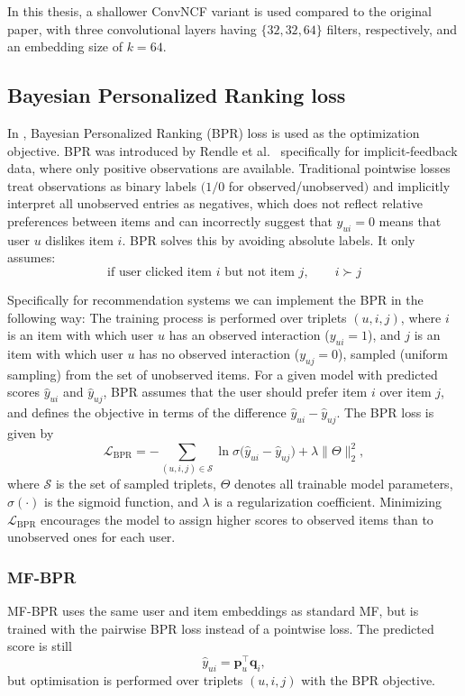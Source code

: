 \documentclass[11pt]{article}
\begin{document}
In this thesis, a shallower ConvNCF variant is used compared to the original paper, with three convolutional layers having $\{32, 32, 64\}$ filters, respectively, and an embedding size of $k=64$.
    
\subsection{Bayesian Personalized Ranking loss}
In \cite{he2018convncf}, Bayesian Personalized Ranking (BPR) loss is used as the optimization objective. 
BPR was introduced by Rendle et al.~\cite{rendle2012bpr} specifically for implicit-feedback data, where 
only positive observations are available. Traditional pointwise losses treat observations as binary labels 
$(1/0$ for observed/unobserved$)$ and implicitly interpret all unobserved entries as negatives, which does 
not reflect relative preferences between items and can incorrectly suggest that $y_{ui} = 0$ means that 
user $u$ dislikes item $i$. BPR solves this by avoiding absolute labels. It only assumes:
\[
\text{if user clicked item } i \text{ but not item } j,\qquad i \succ j
\]

Specifically for recommendation systems we can implement the BPR in the following way:
The training process is performed over triplets $(u,i,j)$, where $i$ is an item with which user $u$ has an observed interaction ($y_{ui} = 1$), and $j$ is an item with which user $u$ has no observed interaction ($y_{uj} = 0$), sampled (uniform sampling) from the set of unobserved items. For a given model with predicted scores $\hat{y}_{ui}$ and $\hat{y}_{uj}$, BPR assumes that the user should prefer item $i$ over item $j$, and defines the objective in terms of the difference $\hat{y}_{ui} - \hat{y}_{uj}$. The BPR loss is given by
\[
    \mathcal{L}_{\text{BPR}}
    = - \sum_{(u,i,j) \in \mathcal{S}} 
      \ln \sigma\!\bigl( \hat{y}_{ui} - \hat{y}_{uj} \bigr)
      + \lambda \lVert \Theta \rVert_2^2,
\]
where $\mathcal{S}$ is the set of sampled triplets, $\Theta$ denotes all trainable model parameters, $\sigma(\cdot)$ is the sigmoid function, and $\lambda$ is a regularization coefficient. Minimizing $\mathcal{L}_{\text{BPR}}$ encourages the model to assign higher scores to observed items than to unobserved ones for each user.


\subsubsection{MF-BPR}

MF-BPR uses the same user and item embeddings as standard MF, but is trained with the pairwise BPR loss instead of a pointwise loss. The predicted score is still
\[
  \hat{y}_{ui} = \mathbf{p}_u^\top \mathbf{q}_i,
\]
but optimisation is performed over triplets $(u,i,j)$ with the BPR objective.
\end{document}
